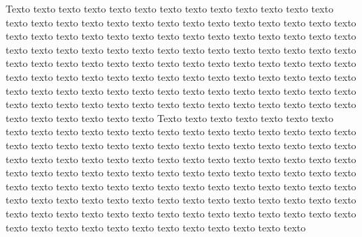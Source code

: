 Texto texto texto texto texto texto texto texto texto texto texto texto texto
texto texto texto texto texto texto texto texto texto texto texto texto texto
texto texto texto texto texto texto texto texto texto texto texto texto texto
texto texto texto texto texto texto texto texto texto texto texto texto texto
texto texto texto texto texto texto texto texto texto texto texto texto texto 
texto texto texto texto texto texto texto texto texto texto texto texto texto 
texto texto texto texto texto texto texto texto texto texto texto texto texto 
texto texto texto texto texto texto texto texto texto texto texto texto texto 
texto texto texto texto texto texto texto texto texto texto texto texto texto
Texto texto texto texto texto texto texto texto texto texto texto texto texto
texto texto texto texto texto texto texto texto texto texto texto texto texto
texto texto texto texto texto texto texto texto texto texto texto texto texto
texto texto texto texto texto texto texto texto texto texto texto texto texto
texto texto texto texto texto texto texto texto texto texto texto texto texto 
texto texto texto texto texto texto texto texto texto texto texto texto texto 
texto texto texto texto texto texto texto texto texto texto texto texto texto 
texto texto texto texto texto texto texto texto texto texto texto texto texto 
texto texto texto texto texto texto texto texto texto texto texto texto texto
